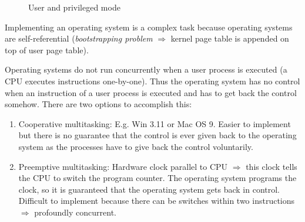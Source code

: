 {{\begin{figure}[H]
			\caption{User and privileged mode}
			\label{fig:kernelvsuserspace}
		\end{figure}
	}
	\par{
		\noindent
		Implementing an operating system is a complex task because operating systems are self-referential (\textit{bootstrapping problem} $\Rightarrow$ kernel page table is appended on top of user page table).
	}
	\par{
		\noindent
		Operating systems do not run concurrently when a user process is executed (a CPU executes instructions one-by-one). Thus the operating system has no control when an instruction of a user process is executed and has to get back the control somehow. There are two options to accomplish this:
		\parskip0pt\begin{enumerate}
			\item{
				Cooperative multitasking: \newline
				E.g. Win 3.11 or Mac OS 9. Easier to implement but there is no guarantee that the control is ever given back to the operating system as the processes have to give back the control voluntarily.
			}
			\item{
				Preemptive multitasking: \newline
				Hardware clock parallel to CPU $\Rightarrow$ this clock tells the CPU to switch the program counter. The operating system programs the clock, so it is guaranteed that the operating system gets back in control. Difficult to implement because there can be switches within two instructions $\Rightarrow$ profoundly concurrent.
			}
		\end{enumerate}
	}
}